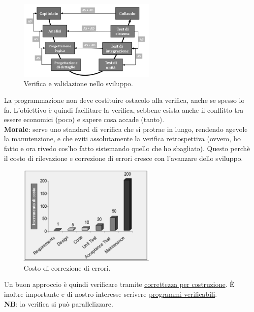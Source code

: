 		\begin{figure}[H]
			\centering
			\includegraphics[width=0.6\textwidth]{img/v}
			\caption{Verifica e validazione nello sviluppo.}
			\label{V}
		\end{figure}
		La programmazione non deve costituire ostacolo alla verifica, anche se spesso lo fa.
		L'obiettivo è quindi facilitare la verifica, sebbene esista anche il conflitto tra essere economici (poco) e sapere cosa accade (tanto). \\
		\textbf{Morale}: serve uno standard di verifica che si protrae in lungo, rendendo agevole la manutenzione, e che eviti assolutamente la verifica retrospettiva (ovvero, ho fatto e ora rivedo cos'ho fatto sistemando quello che ho sbagliato).
		Questo perchè il costo di rilevazione e correzione di errori cresce con l’avanzare dello sviluppo.	%

		\begin{figure}[H]
			\centering
			\includegraphics[width=0.6\textwidth]{img/costi}
			\caption{Costo di correzione di errori.}
		\end{figure}

		Un buon approccio è quindi verificare tramite \underline{\hyperref[byconstruction]{correttezza per costruzione}}.
		È inoltre importante e di nostro interesse scrivere \underline{\hyperref[programmiverificabili]{programmi verificabili}}. \\
		\textbf{NB}: la verifica si può parallelizzare.


